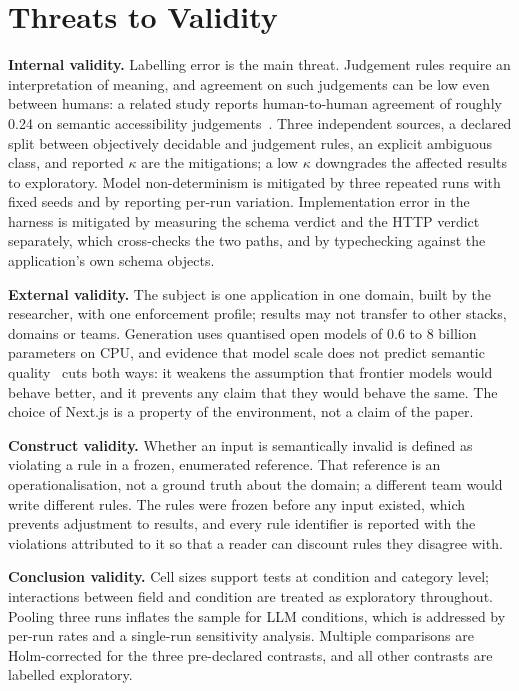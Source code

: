 \documentclass[conference]{IEEEtran}
\begin{document}
\section{Threats to Validity}
\label{sec:threats}

\textbf{Internal validity.} Labelling error is the main threat. Judgement rules require an
interpretation of meaning, and agreement on such judgements can be low even between humans: a related
study reports human-to-human agreement of roughly 0.24 on semantic accessibility
judgements~\cite{calo2026semanticgap}. Three independent sources, a declared split between
objectively decidable and judgement rules, an explicit ambiguous class, and reported $\kappa$ are the
mitigations; a low $\kappa$ downgrades the affected results to exploratory. Model non-determinism is
mitigated by three repeated runs with fixed seeds and by reporting per-run variation. Implementation
error in the harness is mitigated by measuring the schema verdict and the HTTP verdict separately,
which cross-checks the two paths, and by typechecking against the application's own schema objects.

\textbf{External validity.} The subject is one application in one domain, built by the researcher,
with one enforcement profile; results may not transfer to other stacks, domains or teams. Generation
uses quantised open models of 0.6 to 8 billion parameters on CPU, and evidence that model scale does
not predict semantic quality~\cite{singh2026sob,wrenn2026enterprise} cuts both ways: it weakens the
assumption that frontier models would behave better, and it prevents any claim that they would behave
the same. The choice of Next.js is a property of the environment, not a claim of the paper.

\textbf{Construct validity.} Whether an input is semantically invalid is defined as violating a rule
in a frozen, enumerated reference. That reference is an operationalisation, not a ground truth about
the domain; a different team would write different rules. The rules were frozen before any input
existed, which prevents adjustment to results, and every rule identifier is reported with the
violations attributed to it so that a reader can discount rules they disagree with.

\textbf{Conclusion validity.} Cell sizes support tests at condition and category level; interactions
between field and condition are treated as exploratory throughout. Pooling three runs inflates the
sample for LLM conditions, which is addressed by per-run rates and a single-run sensitivity analysis.
Multiple comparisons are Holm-corrected for the three pre-declared contrasts, and all other
contrasts are labelled exploratory.
\end{document}

